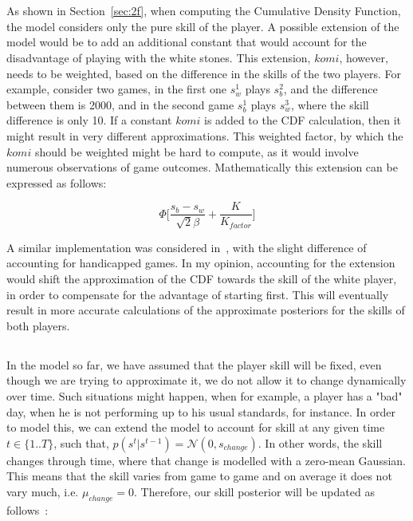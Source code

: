 \documentclass[a4paper,11pt]{article}
\theoremstyle{mytheor}
\begin{document}
\section{}

\subsection{}
As shown in Section~\ref{sec:2f}, when computing the Cumulative Density Function, the model considers only the pure skill of the player. A possible extension of the model would be to add an additional constant that would account for the disadvantage of playing with the white stones. This extension, $komi$, however, needs to be weighted, based on the difference in the skills of the two players. For example, consider two games, in the first one $s_w^1$ plays $s_b^2$, and the difference between them is 2000, and in the second game $s_b^1$ plays $s_w^3$, where the skill difference is only 10. If a constant $komi$ is added to the CDF calculation, then it might result in very different approximations. This weighted factor, by which the $komi$ should be weighted might be hard to compute, as it would involve numerous observations of game outcomes. Mathematically this extension can be expressed as follows:

\begin{equation}
    \Phi \Big[ \frac{s_b - s_w}{\sqrt{2}\beta} + \frac{K}{K_{factor}} \Big]
\end{equation}

A similar implementation was considered in~\cite{stanescu2011rating}, with the slight difference of accounting for handicapped games. In my opinion, accounting for the extension would shift the approximation of the CDF towards the skill of the white player, in order to compensate for the advantage of starting first. This will eventually result in more accurate calculations of the approximate posteriors for the skills of both players.

\subsection{}
In the model so far, we have assumed that the player skill will be fixed, even though we are trying to approximate it, we do not allow it to change dynamically over time. Such situations might happen, when for example, a player has a "bad" day, when he is not performing up to his usual standards, for instance. In order to model this, we can extend the model to account for skill at any given time $t \in \{1..T\}$, such that, $p(s^t|s^{t-1})=\mathcal{N}(0, s_{change})$. In other words, the skill changes through time, where that change is modelled with a zero-mean Gaussian. This means that the skill varies from game to game and on average it does not vary much, i.e. $\mu_{change}=0$. Therefore, our skill posterior will be updated as follows~\cite{bishop2013model}:
\end{document}
